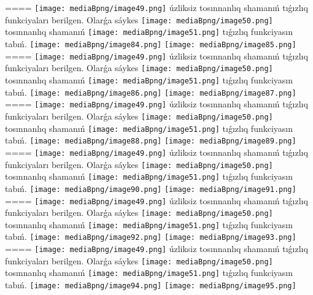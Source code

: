 ====
\texttt{[image: mediaBpng/image49.png]} úzliksiz tosınnanlıq shamanıń tıǵızlıq funkciyaları berilgen. Olarǵa sáykes \texttt{[image: mediaBpng/image50.png]} tosınnanlıq shamanıń \texttt{[image: mediaBpng/image51.png]} tıǵızlıq funkciyasın tabıń. \texttt{[image: mediaBpng/image84.png]} \texttt{[image: mediaBpng/image85.png]}
====
\texttt{[image: mediaBpng/image49.png]} úzliksiz tosınnanlıq shamanıń tıǵızlıq funkciyaları berilgen. Olarǵa sáykes \texttt{[image: mediaBpng/image50.png]} tosınnanlıq shamanıń \texttt{[image: mediaBpng/image51.png]} tıǵızlıq funkciyasın tabıń. \texttt{[image: mediaBpng/image86.png]} \texttt{[image: mediaBpng/image87.png]}
====
\texttt{[image: mediaBpng/image49.png]} úzliksiz tosınnanlıq shamanıń tıǵızlıq funkciyaları berilgen. Olarǵa sáykes \texttt{[image: mediaBpng/image50.png]} tosınnanlıq shamanıń \texttt{[image: mediaBpng/image51.png]} tıǵızlıq funkciyasın tabıń. \texttt{[image: mediaBpng/image88.png]} \texttt{[image: mediaBpng/image89.png]}
====
\texttt{[image: mediaBpng/image49.png]} úzliksiz tosınnanlıq shamanıń tıǵızlıq funkciyaları berilgen. Olarǵa sáykes \texttt{[image: mediaBpng/image50.png]} tosınnanlıq shamanıń \texttt{[image: mediaBpng/image51.png]} tıǵızlıq funkciyasın tabıń. \texttt{[image: mediaBpng/image90.png]} \texttt{[image: mediaBpng/image91.png]}
====
\texttt{[image: mediaBpng/image49.png]} úzliksiz tosınnanlıq shamanıń tıǵızlıq funkciyaları berilgen. Olarǵa sáykes \texttt{[image: mediaBpng/image50.png]} tosınnanlıq shamanıń \texttt{[image: mediaBpng/image51.png]} tıǵızlıq funkciyasın tabıń. \texttt{[image: mediaBpng/image92.png]} \texttt{[image: mediaBpng/image93.png]}
====
\texttt{[image: mediaBpng/image49.png]} úzliksiz tosınnanlıq shamanıń tıǵızlıq funkciyaları berilgen. Olarǵa sáykes \texttt{[image: mediaBpng/image50.png]} tosınnanlıq shamanıń \texttt{[image: mediaBpng/image51.png]} tıǵızlıq funkciyasın tabıń. \texttt{[image: mediaBpng/image94.png]} \texttt{[image: mediaBpng/image95.png]}

